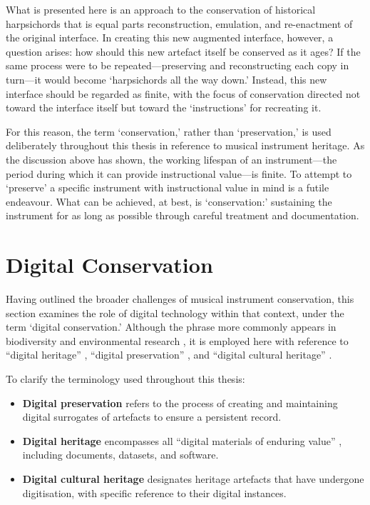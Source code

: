 What is presented here is an approach to the conservation of historical
harpsichords that is equal parts reconstruction, emulation, and re-enactment of
the original interface. In creating this new augmented interface, however, a
question arises: how should this new artefact itself be conserved as it ages? If
the same process were to be repeated---preserving and reconstructing each copy in
turn---it would become `harpsichords all the way down.' Instead, this new
interface should be regarded as finite, with the focus of conservation directed
not toward the interface itself but toward the `instructions' for recreating it.

For this reason, the term `conservation,' rather than `preservation,' is used
deliberately throughout this thesis in reference to musical instrument heritage.
As the discussion above has shown, the working lifespan of an instrument---the
period during which it can provide instructional value---is finite. To attempt to
`preserve' a specific instrument with instructional value in mind is a futile
endeavour. What can be achieved, at best, is `conservation:' sustaining the
instrument for as long as possible through careful treatment and documentation.



\section{Digital Conservation}\label{sec:digital-conservation}

Having outlined the broader challenges of musical instrument conservation, this
section examines the role of digital technology within that context, under the
term `digital conservation.' Although the phrase more commonly appears in
biodiversity and environmental research \cite{vanderwal_digital_2015}, it is
employed here with reference to ``digital heritage''
\cite{unesco_heritage_2003}, ``digital preservation''
\cite{garrett_preserving_1996}, and ``digital cultural heritage''
\cite{fresa_digital_2014}.

To clarify the terminology used throughout this thesis:

\begin{itemize}
	\item \textbf{Digital preservation} refers to the process of creating and
	      maintaining digital surrogates of artefacts to ensure a persistent record.
	\item \textbf{Digital heritage} encompasses all ``digital materials of
	      enduring value'' \cite{unesco_heritage_2003}, including documents, datasets,
	      and software.
	\item \textbf{Digital cultural heritage} designates heritage artefacts that
	      have undergone digitisation, with specific reference to their digital
	      instances.
\end{itemize}

